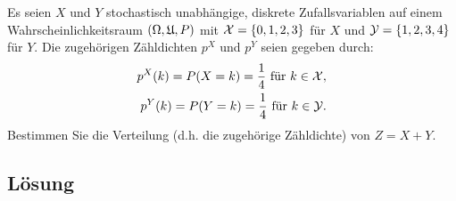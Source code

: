 \documentclass{exercise}
\begin{document}
    \begin{problem}
        Es seien \(X\) und \(Y\) stochastisch unabhängige, diskrete Zufallsvariablen auf einem Wahrscheinlichkeitsraum \(\parentheses*{\Omega, \mathfrak{U}, P}\) mit \(\mathcal{X} = \braces*{0, 1, 2, 3}\) für \(X\) und \(\mathcal{Y} = \braces*{1, 2, 3, 4}\) für \(Y\).
        Die zugehörigen Zähldichten \(p^X\) und \(p^Y\) seien gegeben durch:
        \begin{align*}
            p^X\parentheses*{k} = P\parentheses*{X = k} = \frac{1}{4}\text{ für }k \in \mathcal{X},\\
            p^Y\parentheses*{k} = P\parentheses*{Y = k} = \frac{1}{4}\text{ für }k \in \mathcal{Y}.
        \end{align*}
        Bestimmen Sie die Verteilung (d.h. die zugehörige Zähldichte) von \(Z = X + Y\).
    \end{problem}

    \subsection*{Lösung}
\end{document}
